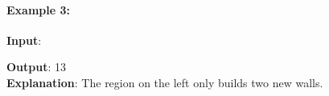 \documentclass[a4paper,12pt]{article}
\begin{document}
\paragraph{Example 3:}
\begin{flushleft}
\textbf{Input}:
\begin{figure}[H]
\end{figure}
\textbf{Output}: 13
\\
\textbf{Explanation}: The region on the left only builds two new walls.
\end{flushleft}
\end{document}
